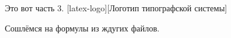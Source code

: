 Это вот часть 3.
[latex-logo][Логотип типографской системы]

Сошлёмся на формулы  из ждугих файлов.
